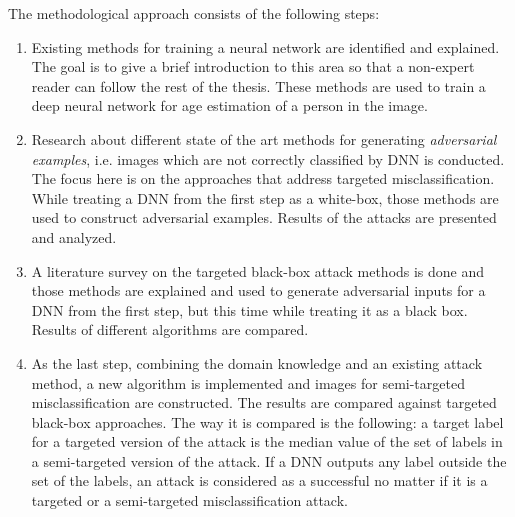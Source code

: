 The methodological approach consists of the following steps:
\begin{enumerate}
    \item Existing methods for training a neural network are identified and explained. The goal is to give a brief introduction to this area so that a non-expert reader can follow the rest of the thesis. These methods are used to train a deep neural network for age estimation of a person in the image.
    
    \item Research about different state of the art methods for generating \textit{adversarial examples}, i.e. images which are not correctly classified by DNN is conducted. The focus here is on the approaches that address targeted misclassification. While treating a DNN from the first step as a white-box, those methods are used to construct adversarial examples. Results of the attacks are presented and analyzed.
    
    \item A literature survey on the targeted black-box attack methods is done and those methods are explained and used to generate adversarial inputs for a DNN  from the first step, but this time while treating it as a black box. Results of different algorithms are compared. 
    
    \item As the last step, combining the domain knowledge and an existing attack method, a new algorithm is implemented and images for semi-targeted misclassification are constructed. The results are compared against targeted black-box approaches. The way it is compared is the following: a target label for a targeted version of the attack is the median value of the set of labels in a semi-targeted version of the attack. If a DNN outputs any label outside the set of the labels, an attack is  considered as a successful no matter if it is a targeted or a semi-targeted misclassification attack.
\end{enumerate}
